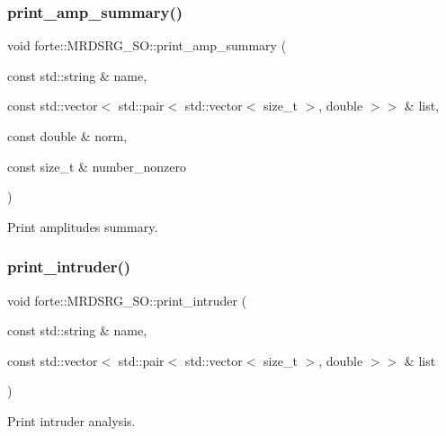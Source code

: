 \subsubsection{\texorpdfstring{print\+\_\+amp\+\_\+summary()}{print\_amp\_summary()}}
{\footnotesize\ttfamily void forte\+::\+M\+R\+D\+S\+R\+G\+\_\+\+S\+O\+::print\+\_\+amp\+\_\+summary (\begin{DoxyParamCaption}\item[{const std\+::string \&}]{name,  }\item[{const std\+::vector$<$ std\+::pair$<$ std\+::vector$<$ size\+\_\+t $>$, double $>$$>$ \&}]{list,  }\item[{const double \&}]{norm,  }\item[{const size\+\_\+t \&}]{number\+\_\+nonzero }\end{DoxyParamCaption})\hspace{0.3cm}{\ttfamily [protected]}}



Print amplitudes summary. 

\mbox{\label{classforte_1_1_m_r_d_s_r_g___s_o_ac0ea4683c8537b2e1cad1bec86095f0c}} 
\subsubsection{\texorpdfstring{print\+\_\+intruder()}{print\_intruder()}}
{\footnotesize\ttfamily void forte\+::\+M\+R\+D\+S\+R\+G\+\_\+\+S\+O\+::print\+\_\+intruder (\begin{DoxyParamCaption}\item[{const std\+::string \&}]{name,  }\item[{const std\+::vector$<$ std\+::pair$<$ std\+::vector$<$ size\+\_\+t $>$, double $>$$>$ \&}]{list }\end{DoxyParamCaption})\hspace{0.3cm}{\ttfamily [protected]}}



Print intruder analysis. 

\mbox{\label{classforte_1_1_m_r_d_s_r_g___s_o_a104abbbcdca7411479e01881ba1c5e3a}} 
